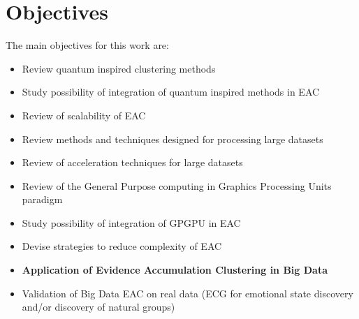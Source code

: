 \section{Objectives}
The main objectives for this work are:
\begin{itemize}

\item Review quantum inspired clustering methods

\item Study possibility of integration of quantum inspired methods in EAC

\item Review of scalability of EAC

\item Review methods and techniques designed for processing large datasets

\item Review of acceleration techniques for large datasets

\item Review of the General Purpose computing in Graphics Processing Units paradigm

\item Study possibility of integration of GPGPU in EAC

\item Devise strategies to reduce complexity of EAC

\item \textbf{Application of Evidence Accumulation Clustering in Big Data}

\item Validation of Big Data EAC on real data (ECG for emotional state discovery and/or discovery of natural groups)
\end{itemize}





